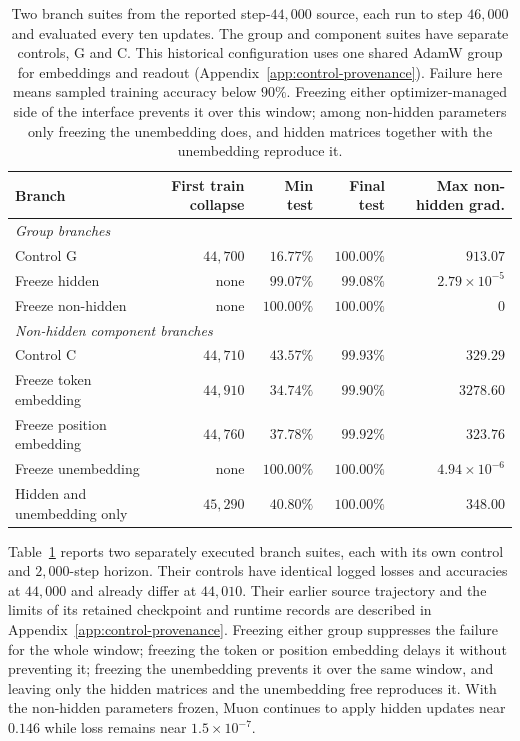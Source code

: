 \documentclass{article}
\begin{document}
\begin{table}[!htbp]
\centering
\small
\caption{Two branch suites from the reported step-$44{,}000$ source, each run to step $46{,}000$ and evaluated every ten updates. The group and component suites have separate controls, G and C. This historical configuration uses one shared AdamW group for embeddings and readout (Appendix~\ref{app:control-provenance}). Failure here means sampled training accuracy below $90\%$. Freezing either optimizer-managed side of the interface prevents it over this window; among non-hidden parameters only freezing the unembedding does, and hidden matrices together with the unembedding reproduce it.}
\label{tab:branches}
\begin{tabular}{lrrrr}
\toprule
Branch & First train collapse & Min test & Final test & Max non-hidden grad. \\
\midrule
\multicolumn{5}{l}{\emph{Group branches}} \\
Control G & $44{,}700$ & $16.77\%$ & $100.00\%$ & $913.07$ \\
Freeze hidden & none & $99.07\%$ & $99.08\%$ & $2.79\times10^{-5}$ \\
Freeze non-hidden & none & $100.00\%$ & $100.00\%$ & $0$ \\
\midrule
\multicolumn{5}{l}{\emph{Non-hidden component branches}} \\
Control C & $44{,}710$ & $43.57\%$ & $99.93\%$ & $329.29$ \\
Freeze token embedding & $44{,}910$ & $34.74\%$ & $99.90\%$ & $3278.60$ \\
Freeze position embedding & $44{,}760$ & $37.78\%$ & $99.92\%$ & $323.76$ \\
Freeze unembedding & none & $100.00\%$ & $100.00\%$ & $4.94\times10^{-6}$ \\
Hidden and unembedding only & $45{,}290$ & $40.80\%$ & $100.00\%$ & $348.00$ \\
\bottomrule
\end{tabular}
\end{table}

Table~\ref{tab:branches} reports two separately executed branch suites, each with its own control and $2{,}000$-step horizon. Their controls have identical logged losses and accuracies at $44{,}000$ and already differ at $44{,}010$. Their earlier source trajectory and the limits of its retained checkpoint and runtime records are described in Appendix~\ref{app:control-provenance}. Freezing either group suppresses the failure for the whole window; freezing the token or position embedding delays it without preventing it; freezing the unembedding prevents it over the same window, and leaving only the hidden matrices and the unembedding free reproduces it. With the non-hidden parameters frozen, Muon continues to apply hidden updates near $0.146$ while loss remains near $1.5\times10^{-7}$.
\end{document}
